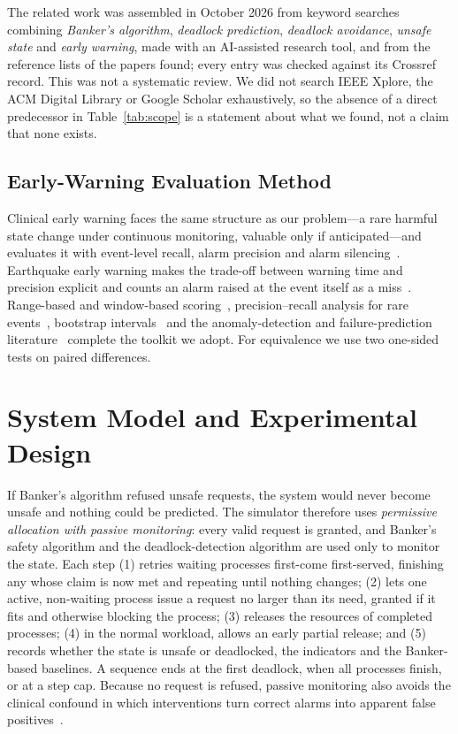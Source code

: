 \documentclass[conference]{IEEEtran}
\begin{document}
The related work was assembled in October 2026 from keyword searches combining \emph{Banker's algorithm}, \emph{deadlock prediction}, \emph{deadlock avoidance}, \emph{unsafe state} and \emph{early warning}, made with an AI-assisted research tool, and from the reference lists of the papers found; every entry was checked against its Crossref record. This was not a systematic review. We did not search IEEE Xplore, the ACM Digital Library or Google Scholar exhaustively, so the absence of a direct predecessor in Table~\ref{tab:scope} is a statement about what we found, not a claim that none exists.

\subsection{Early-Warning Evaluation Method}\label{sec:bg-method}
Clinical early warning faces the same structure as our problem---a rare harmful state change under continuous monitoring, valuable only if anticipated---and evaluates it with event-level recall, alarm precision and alarm silencing~\cite{Hyland2020}. Earthquake early warning makes the trade-off between warning time and precision explicit and counts an alarm raised at the event itself as a miss~\cite{Munchmeyer2021}. Range-based and window-based scoring~\cite{Tatbul2018,Lavin2015}, precision--recall analysis for rare events~\cite{Saito2015,Davis2006}, bootstrap intervals~\cite{Efron1993} and the anomaly-detection and failure-prediction literature~\cite{Chandola2009,Salfner2010} complete the toolkit we adopt. For equivalence we use two one-sided tests on paired differences.

\section{System Model and Experimental Design}\label{sec:design}

If Banker's algorithm refused unsafe requests, the system would never become unsafe and nothing could be predicted. The simulator therefore uses \emph{permissive allocation with passive monitoring}: every valid request is granted, and Banker's safety algorithm and the deadlock-detection algorithm are used only to monitor the state. Each step (1) retries waiting processes first-come first-served, finishing any whose claim is now met and repeating until nothing changes; (2) lets one active, non-waiting process issue a request no larger than its need, granted if it fits and otherwise blocking the process; (3) releases the resources of completed processes; (4) in the normal workload, allows an early partial release; and (5) records whether the state is unsafe or deadlocked, the indicators and the Banker-based baselines. A sequence ends at the first deadlock, when all processes finish, or at a step cap. Because no request is refused, passive monitoring also avoids the clinical confound in which interventions turn correct alarms into apparent false positives~\cite{Hyland2020}.
\end{document}
